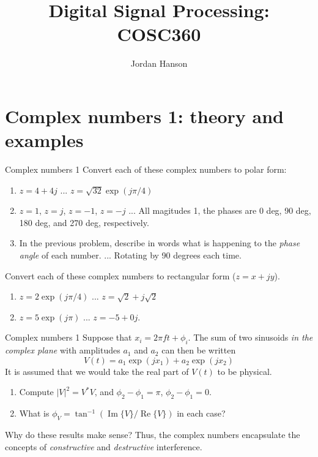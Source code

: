 \documentclass{beamer}
\title{Digital Signal Processing: COSC360}
\author{Jordan Hanson}
\institute{Whittier College Department of Physics and Astronomy}
\begin{document}
\maketitle

\section{Complex numbers 1: theory and examples}

\begin{frame}{Complex numbers 1}
Convert each of these complex numbers to polar form:
\begin{enumerate}
\item $z = 4 + 4j$ ... $z = \sqrt{32} \exp(j \pi/4)$
\item $z = 1$, $z = j$, $z = -1$, $z = -j$ ... All magitudes 1, the phases are 0 deg, 90 deg, 180 deg, and 270 deg, respectively.
\item In the previous problem, describe in words what is happening to the \textit{phase angle} of each number. ... Rotating by 90 degrees each time.
\end{enumerate}
Convert each of these complex numbers to rectangular form ($z = x + jy$).
\begin{enumerate}
\item $z = 2 \exp(j \pi/4)$ ... $z = \sqrt{2} + j\sqrt{2}$
\item $z = 5 \exp(j \pi)$ ... $z = -5 + 0 j$.
\end{enumerate}
\end{frame}

\begin{frame}{Complex numbers 1}
Suppose that $x_i = 2\pi ft+\phi_i$.  The sum of two sinusoids \textit{in the complex plane} with amplitudes $a_1$ and $a_2$ can then be written
\begin{equation}
V(t) = a_1\exp(j x_1) + a_2\exp(j x_2)
\end{equation}
It is assumed that we would take the real part of $V(t)$ to be physical.
\begin{enumerate}
\item Compute $|V|^2 = V^*V$, and $\phi_2 - \phi_1 = \pi$, $\phi_2 - \phi_1 = 0$.
\item What is $\phi_V = \tan^{-1}(\operatorname{Im}\lbrace V \rbrace/\operatorname{Re}\lbrace V \rbrace)$ in each case?
\end{enumerate}
Why do these results make sense?  Thus, the complex numbers encapsulate the concepts of \textit{constructive} and \textit{destructive} interference.
\end{frame}
\end{document}
